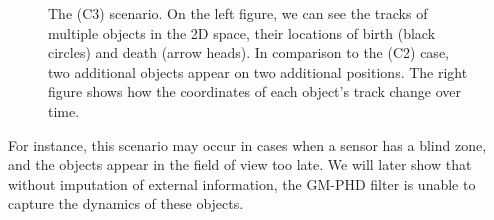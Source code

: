 \begin{figure}
\begin{subfigure}[]{0.48\linewidth}
\begin{subfigure}[b]{\linewidth}
        \end{subfigure}
    \end{subfigure}
  \caption[True tracks of objects in the (C3) scenario.]{The (C3) scenario. On the left figure, we can see the tracks of multiple objects in the 2D space, their locations of birth (black circles) and death (arrow heads). In comparison to the (C2) case, two additional objects appear on two additional positions. The right figure shows how the coordinates of each object's track change over time.}
  \label{fig:c3-scenario}
\end{figure}

For instance, this scenario may occur in cases when a sensor has a blind zone, and the objects appear in the field of view too late. We will later show that without imputation of external information, the GM-PHD filter is unable to capture the dynamics of these objects.
